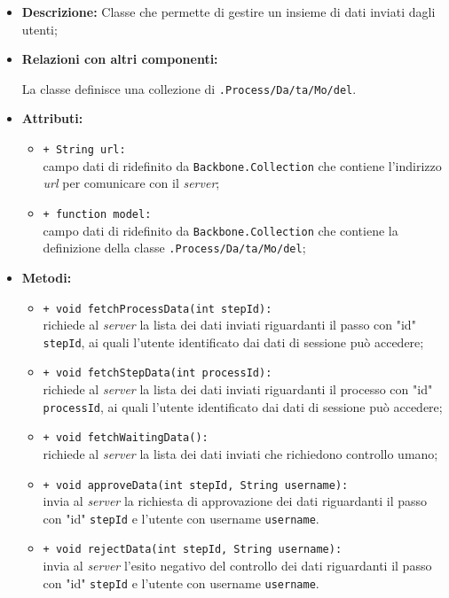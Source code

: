 \begin{flushleft}
\begin{itemize}
\item \textbf{Descrizione:} Classe che permette di gestire un insieme di dati inviati dagli utenti;
\item \textbf{Relazioni con altri componenti:}
\begin{sloppypar}
La classe definisce una collezione di \texttt{\model{}.Process\fshyp{}Da\fshyp{}ta\fshyp{}Mo\fshyp{}del}.
\end{sloppypar}
\item \textbf{Attributi:}
\begin{sloppypar}
\begin{itemize}
\item \texttt{+ String url:}\\ campo dati di ridefinito da \texttt{Backbone.Collection} che contiene l'indirizzo \textit{url} per comunicare con il \textit{server};
\item \texttt{+ function model:}\\ campo dati di ridefinito da \texttt{Backbone.Collection} che contiene la definizione della classe \texttt{\model{}.Process\fshyp{}Da\fshyp{}ta\fshyp{}Mo\fshyp{}del};
\end{itemize}
\end{sloppypar}
\item \textbf{Metodi:}
\begin{sloppypar}
\begin{itemize}
\item \texttt{+ void fetchProcessData(int stepId):}\\ richiede al \textit{server} la lista dei dati inviati riguardanti il passo con "id" \texttt{stepId}, ai quali l'utente identificato dai dati di sessione può accedere;
\item \texttt{+ void fetchStepData(int processId):}\\ richiede al \textit{server} la lista dei dati inviati riguardanti il processo con "id" \texttt{processId}, ai quali l'utente identificato dai dati di sessione può accedere;
\item \texttt{+ void fetchWaitingData():}\\ richiede al \textit{server} la lista dei dati inviati che richiedono controllo umano;
\item \texttt{+ void approveData(int stepId, String username):}\\ invia al \textit{server} la richiesta di approvazione dei dati riguardanti il passo con "id" \texttt{stepId} e l'utente con username \texttt{username}.
\item \texttt{+ void rejectData(int stepId, String username):}\\ invia al \textit{server} l'esito negativo del controllo dei dati riguardanti il passo con "id" \texttt{stepId} e l'utente con username \texttt{username}.
\end{itemize}
\end{sloppypar}
\end{itemize}
\end{flushleft}

